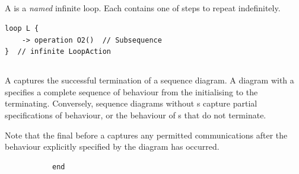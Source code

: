 \subsection{\mloopaction}

A \mloopaction{} is a \emph{named} infinite loop.    Each \mloopaction{} contains one
\msubsequence{} of steps to repeat indefinitely.

\begin{lstlisting}[style=Example]
loop L {
    -> operation O2()  // Subsequence
}  // infinite LoopAction
\end{lstlisting}

\subsection{\mfinalaction}

A \mfinalaction{} captures the successful termination of a sequence diagram.
A diagram with a \mfinalaction{} specifies a complete sequence of behaviour
from the \mtarget{} initialising to the \mtarget{} terminating.  Conversely,
sequence diagrams without \mfinalaction s capture partial specifications of
behaviour, or the behaviour of \mtarget s that do not terminate.

Note that the final \msequencegap{} before a \mfinalaction{} captures
any permitted communications after the behaviour explicitly specified by the
diagram has occurred.

\begin{figure}[h]

\begin{subfigure}[t]{0.38\textwidth}
\begin{lstlisting}[style=Example]
end
\end{lstlisting}
\end{subfigure}
\hfill
\begin{subfigure}[t]{0.58\textwidth}
\gsecaption
\centering
{}
\end{subfigure}

\end{figure}

